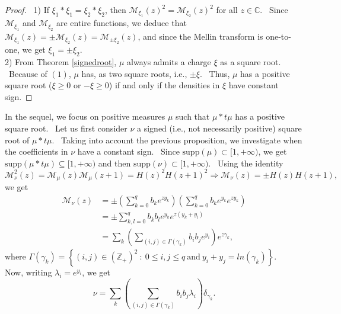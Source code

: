 \documentclass[12pt]{amsart}
\newcommand{\C}{\mathbb{C}}
\begin{document}
\begin{proof} \ 1) If  $\xi_1*\xi_1 = \xi_2*\xi_2$, then
$ \mathcal{M}_{\xi_1}(z)^2 = \mathcal{M}_{\xi_2}(z)^2$
for all $z\in\C$. \ Since  $\mathcal{M}_{\xi_1}$ and $ \mathcal{M}_{\xi_2}$ are entire functions, we deduce that  $\mathcal{M}_{\xi_1}(z) = \pm\mathcal{M}_{\xi_2}(z)=\mathcal{M}_{\pm\xi_2}(z)$, and since the Mellin transform is one-to-one, we get  $\xi_1 = \pm \xi_2$.\\
2) From Theorem \ref{signedroot}, $\mu$ always admits a charge $\xi$ as a square root. \ Because of $(1)$,  $\mu$ has, as two square roots, i.e., $\pm\xi$. \ Thus, $\mu$ has a positive square root ($\xi\ge 0$ or $-\xi\ge 0$) if and only if the densities in $\xi$ have constant sign.
\end{proof}

In the sequel, we focus on positive measures $\mu$ such that $\mu*t\mu$ has a positive square root. \ Let us first consider  $\nu$ a signed (i.e., not necessarily positive) square root of $\mu*t\mu$. \ Taking into account the previous proposition, we investigate when the coefficients in $\nu$ have a constant sign. \ Since $\textrm{supp}(\mu)\subset[1,+\infty)$, we get $\textrm{supp}(\mu*t\mu)\subseteq [1,+\infty)$ and then $\textrm{supp}(\nu)\subset[1,+\infty)$.
\ Using the identity
$$
\mathcal{M}_{\nu}^2(z)=\mathcal{M}_{\mu}(z)\mathcal{M}_{\mu}(z+1)=H(z)^2H(z+1)^2 \Rightarrow \mathcal{M}_{\nu}(z)=\pm H(z)H(z+1),
$$
we get
	\begin{equation*}\begin{array}{ll}
	   \mathcal{M}_{\nu}(z)  & =\pm \left(\sum_{k=0}^q b_k e^{zy_k}\right)\left(\sum_{k=0}^q b_ke^{y_k} e^{zy_k}\right) \\
	     & =\pm \sum_{k,l=0}^q b_kb_le^{y_k} e^{z(y_k+y_l)}\\
      & =\sum_k \left(\sum_{(i,j)\in \Gamma(\gamma_k)} b_ib_je^{y_i}\right) e^{z\gamma_k},
	\end{array}
	\end{equation*}
 where $\Gamma(\gamma_k)=\left\{ (i,j)\in(\mathbb{Z}_+)^2\ :\ 0\leq i,j\leq q\ \mbox{and}\ y_i+y_j=ln(\gamma_k)\right\}$.\\
 Now, writing $ \lambda_i = e^{y_i}$, we get \begin{equation}\label{ur}\nu=\sum_k\left(\sum_{(i,j)\in \Gamma(\gamma_k)}b_ib_j\lambda_i\right)\delta_{\gamma_k}.\end{equation}
\end{document}
